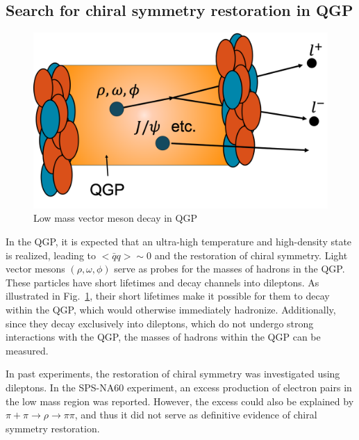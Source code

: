     \subsection{Search for chiral symmetry restoration in QGP}
        \begin{figure}[hbtp]
            \centering
            \includegraphics[keepaspectratio, scale=0.2]{fig/1_7_Search_for_chiral.png}
            \caption{Low mass vector meson decay in QGP}
            \label{Intro:Search_for_CSR:Low_mass_vector_meson_decay_in_QGP}
        \end{figure}
        
        In the QGP, it is expected that an ultra-high temperature and high-density state is realized, leading to $ < \bar{q}q > \sim 0 $ and the restoration of chiral symmetry. Light vector mesons $(\rho, \omega, \phi)$ serve as probes for the masses of hadrons in the QGP. These particles have short lifetimes and decay channels into dileptons. As illustrated in Fig.~\ref{Intro:Search_for_CSR:Low_mass_vector_meson_decay_in_QGP}, their short lifetimes make it possible for them to decay within the QGP, which would otherwise immediately hadronize. Additionally, since they decay exclusively into dileptons, which do not undergo strong interactions with the QGP, the masses of hadrons within the QGP can be measured.  
        
        In past experiments, the restoration of chiral symmetry was investigated using dileptons. In the SPS-NA60 experiment, an excess production of electron pairs in the low mass region was reported. However, the excess could also be explained by $\pi + \pi \rightarrow \rho \rightarrow \pi \pi$, and thus it did not serve as definitive evidence of chiral symmetry restoration\cite{NA60}.  
        
